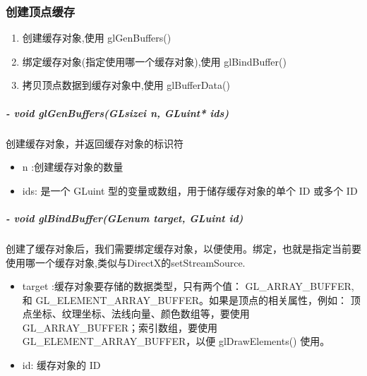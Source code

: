 \documentclass[UTF8,a4paper,8pt]{ctexbook}
\begin{document}
		\subsubsection{创建顶点缓存}
			\begin{enumerate}
				\item 创建缓存对象,使用 glGenBuffers()
				\item 绑定缓存对象(指定使用哪一个缓存对象),使用 glBindBuffer()
				\item 拷贝顶点数据到缓存对象中,使用 glBufferData()
			\end{enumerate}
			
			\subparagraph{- void glGenBuffers(GLsizei n, GLuint* ids)}创建缓存对象，并返回缓存对象的标识符
				\begin{itemize}
					\item n :创建缓存对象的数量
					\item ids: 是一个 GLuint 型的变量或数组，用于储存缓存对象的单个 ID 或多个 ID
				\end{itemize}
				
			\subparagraph{- void glBindBuffer(GLenum target, GLuint id)}创建了缓存对象后，我们需要绑定缓存对象，以便使用。绑定，也就是指定当前要使用哪一个缓存对象,类似与DirectX的setStreamSource.
				\begin{itemize}
					\item target :缓存对象要存储的数据类型，只有两个值： GL\_ARRAY\_BUFFER, 和 GL\_ELEMENT\_ARRAY\_BUFFER。如果是顶点的相关属性，例如： 顶点坐标、纹理坐标、法线向量、颜色数组等，要使用 GL\_ARRAY\_BUFFER；索引数组，要使用 GL\_ELEMENT\_ARRAY\_BUFFER，以便 glDrawElements() 使用。
					
					\item id: 缓存对象的 ID
				\end{itemize}
			
\end{document}

